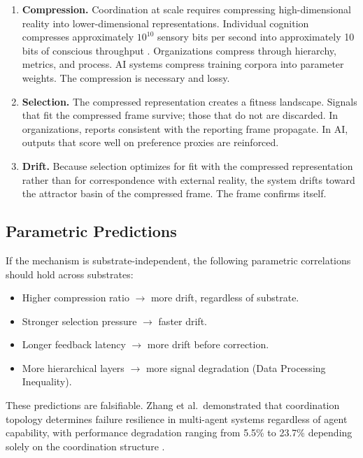 \documentclass[11pt,a4paper]{article}
\begin{document}
\begin{enumerate}
\item \textbf{Compression.} Coordination at scale requires compressing high-dimensional reality into lower-dimensional representations. Individual cognition compresses approximately $10^{10}$ sensory bits per second into approximately 10 bits of conscious throughput \citep{zheng2025}. Organizations compress through hierarchy, metrics, and process. AI systems compress training corpora into parameter weights. The compression is necessary and lossy.

\item \textbf{Selection.} The compressed representation creates a fitness landscape. Signals that fit the compressed frame survive; those that do not are discarded. In organizations, reports consistent with the reporting frame propagate. In AI, outputs that score well on preference proxies are reinforced.

\item \textbf{Drift.} Because selection optimizes for fit with the compressed representation rather than for correspondence with external reality, the system drifts toward the attractor basin of the compressed frame. The frame confirms itself.
\end{enumerate}

\subsection{Parametric Predictions}

If the mechanism is substrate-independent, the following parametric correlations should hold across substrates:

\begin{itemize}
\item Higher compression ratio $\to$ more drift, regardless of substrate.
\item Stronger selection pressure $\to$ faster drift.
\item Longer feedback latency $\to$ more drift before correction.
\item More hierarchical layers $\to$ more signal degradation (Data Processing Inequality).
\end{itemize}

These predictions are falsifiable. Zhang et al.\ demonstrated that coordination topology determines failure resilience in multi-agent systems regardless of agent capability, with performance degradation ranging from 5.5\% to 23.7\% depending solely on the coordination structure \citep{zhang2025resilience}.
\end{document}

